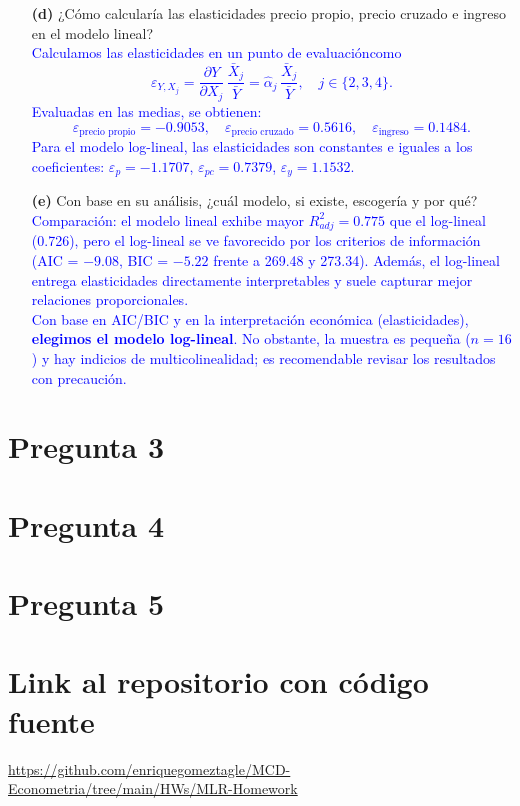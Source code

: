 \documentclass[10pt]{article}
\begin{document}
\begin{enumerate}
    \item[\textbf{(d)}] ¿Cómo calcularía las elasticidades precio propio, precio cruzado e ingreso en el modelo lineal?\\
    \textcolor{blue}{
        Calculamos las elasticidades en un punto de evaluacióncomo
        \[
        \varepsilon_{Y,X_j}= \frac{\partial Y}{\partial X_j}\,\frac{\bar X_j}{\bar Y}=\hat{\alpha}_j\,\frac{\bar X_j}{\bar Y},\quad j\in\{2,3,4\}.
        \]
        Evaluadas en las medias, se obtienen:
        \[
        \varepsilon_{\text{precio propio}}=-0.9053,\quad \varepsilon_{\text{precio cruzado}}=0.5616,\quad \varepsilon_{\text{ingreso}}=0.1484.
        \]
        Para el modelo log-lineal, las elasticidades son constantes e iguales a los coeficientes: \(\varepsilon_{p}=-1.1707\), \(\varepsilon_{pc}=0.7379\), \(\varepsilon_{y}=1.1532\).
    }
    
    \item[\textbf{(e)}] Con base en su análisis, ¿cuál modelo, si existe, escogería y por qué?\\
    \textcolor{blue}{
        Comparación: el modelo lineal exhibe mayor \(R^2_{adj}=0.775\) que el log-lineal (0.726), pero el log-lineal se ve favorecido por los criterios de información (AIC = \(-9.08\), BIC = \(-5.22\) frente a 269.48 y 273.34). Además, el log-lineal entrega elasticidades directamente interpretables y suele capturar mejor relaciones proporcionales.\\
        Con base en AIC/BIC y en la interpretación económica (elasticidades), \textbf{elegimos el modelo log-lineal}. No obstante, la muestra es pequeña (\(n=16\)) y hay indicios de multicolinealidad; es recomendable revisar los resultados con precaución.
    }
\end{enumerate}
\section{Pregunta 3}
\section{Pregunta 4}
\section{Pregunta 5}
\section{Link al repositorio con código fuente}
\url{https://github.com/enriquegomeztagle/MCD-Econometria/tree/main/HWs/MLR-Homework}
\end{document}
